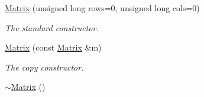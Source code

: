 \begin{DoxyCompactItemize}
\item 
\hyperlink{class_matrix_a53f60218c002f2bb454695a1fc35c5d3}{Matrix} (unsigned long rows=0, unsigned long cols=0)
\begin{DoxyCompactList}\small\item\em The standard constructor. \end{DoxyCompactList}\item 
\hyperlink{class_matrix_a3796b4f32dc8e11f908a90fd3dd39c45}{Matrix} (const \hyperlink{class_matrix}{Matrix} \&m)
\begin{DoxyCompactList}\small\item\em The copy constructor. \end{DoxyCompactList}\item 
\hyperlink{class_matrix_a91aa704de674203e96aece9e1955ccd3}{$\sim$\+Matrix} ()\hypertarget{class_matrix_a91aa704de674203e96aece9e1955ccd3}{}\label{class_matrix_a91aa704de674203e96aece9e1955ccd3}


\end{DoxyCompactItemize}
